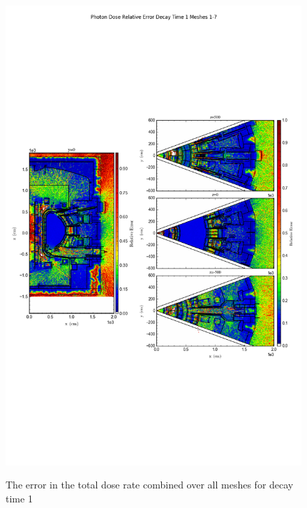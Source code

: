 \documentclass[12pt]{article}
\begin{document}
\begin{figure}[ht!]
\centering
\includegraphics[trim={0cm 9cm 0cm 10cm},clip,scale=0.75]{../plots/final_model/Photon_Dose_Relative_Error_Decay_Time_1_Meshes_1-7.png}
\label{fig:photons_dc1_b4c_total_error}
\caption{The error in the total dose rate combined over all meshes for decay time 1}
\end{figure}
\end{document}
